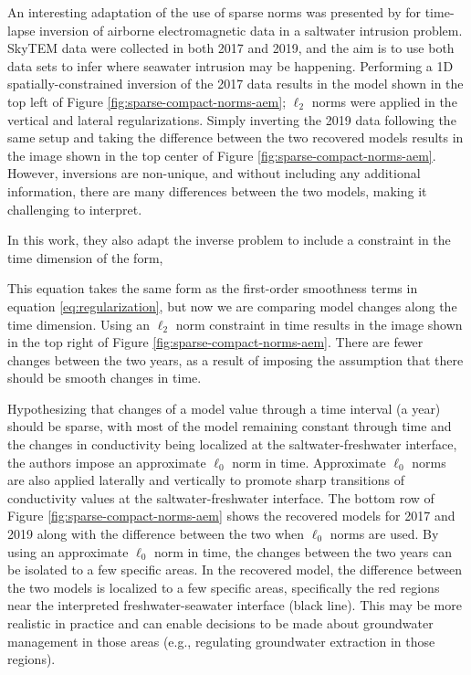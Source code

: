 

An interesting adaptation of the use of sparse norms was presented by \citep{kang_time-lapse_2022} for time-lapse inversion of airborne electromagnetic data in a saltwater intrusion problem. SkyTEM data were collected in both 2017 and 2019, and the aim is to use both data sets to infer where seawater intrusion may be happening. Performing a 1D spatially-constrained inversion of the 2017 data results in the model shown in the top left of Figure \ref{fig:sparse-compact-norms-aem}; $\ell_2$ norms were applied in the vertical and lateral regularizations. Simply inverting the 2019 data following the same setup and taking the difference between the two recovered models results in the image shown in the top center of Figure \ref{fig:sparse-compact-norms-aem}. However, inversions are non-unique, and without including any additional information, there are many differences between the two models, making it challenging to interpret.

In this work, they also adapt the inverse problem to include a constraint in the time dimension of the form,

This equation takes the same form as the first-order smoothness terms in equation \ref{eq:regularization}, but now we are comparing model changes along the time dimension.
Using an $\ell_2$ norm constraint in time results in the image shown in the top right of Figure \ref{fig:sparse-compact-norms-aem}. There are fewer changes between the two years, as a result of imposing the assumption that there should be smooth changes in time.

Hypothesizing that changes of a model value through a time interval (a year) should be sparse, with most of the model remaining constant through time and the changes in conductivity being localized at the saltwater-freshwater interface, the authors impose an approximate $\ell_0$ norm in time. Approximate $\ell_0$ norms are also applied laterally and vertically to promote sharp transitions of conductivity values at the saltwater-freshwater interface. The bottom row of Figure \ref{fig:sparse-compact-norms-aem} shows the recovered models for 2017 and 2019 along with the difference between the two when $\ell_0$ norms are used. By using an approximate $\ell_0$ norm in time, the changes between the two years can be isolated to a few specific areas.  In the recovered model, the difference between the two models is localized to a few specific areas, specifically the red regions near the interpreted freshwater-seawater interface (black line). This may be more realistic in practice and can enable decisions to be made about groundwater management in those areas (e.g., regulating groundwater extraction in those regions).

